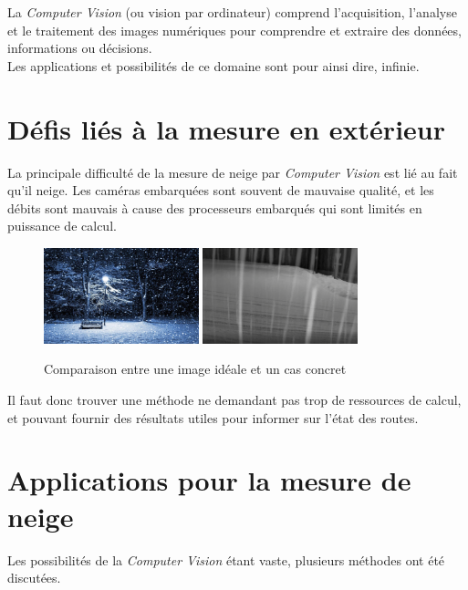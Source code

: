 La \emph{Computer Vision} (ou vision par ordinateur) comprend l'acquisition, l'analyse et
le traitement des images numériques pour comprendre et extraire des données, informations
ou décisions.\\
Les applications et possibilités de ce domaine sont pour ainsi dire, infinie.

\section{Défis liés à la mesure en extérieur}
La principale difficulté de la mesure de neige par \emph{Computer Vision} est lié au fait
qu'il neige. Les caméras embarquées sont souvent de mauvaise qualité, et les débits
sont mauvais à cause des processeurs embarqués qui sont limités en puissance de calcul.

\begin{figure}[H]
    \centering
    \includegraphics[width=0.4\textwidth]{Images/computer_vision/perfect_snow.jpg}
    \includegraphics[width=0.4\textwidth]{Images/computer_vision/real_snow.png}
    \caption[]{Comparaison entre une image idéale \footnotemark[1] et un cas concret\footnotemark[2]}
    \label{Snow comparison}
\end{figure}

\noindent
Il faut donc trouver une méthode ne demandant pas trop de ressources de calcul, et pouvant fournir
des résultats utiles pour informer sur l'état des routes.

\section{Applications pour la mesure de neige}
Les possibilités de la \emph{Computer Vision} étant vaste, plusieurs méthodes ont été discutées.

